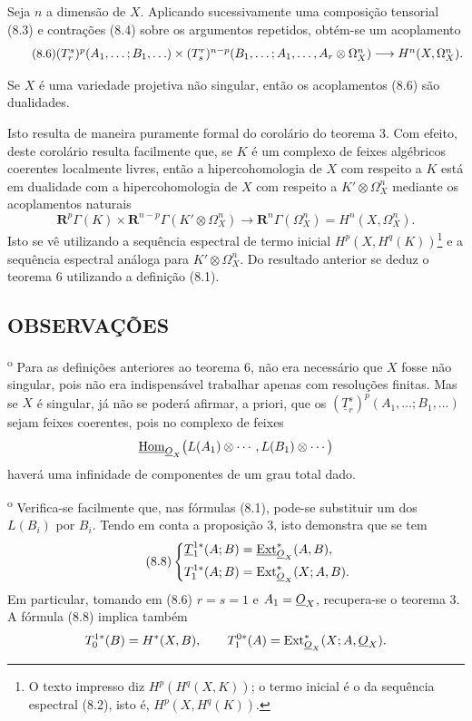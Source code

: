 Seja $n$ a dimensão de $X$. Aplicando sucessivamente uma composição
tensorial (8.3) e contrações (8.4) sobre os argumentos repetidos, obtém-se
um acoplamento
\begin{equation}\tag{8.6}
\resizebox{\textwidth}{!}{$
  (T_{r}^{s})^{p}(A_1,\ldots;B_1,\ldots)
  \times
  (T_{s}^{r})^{n-p}(B_1,\ldots;A_1,\ldots,A_r\otimes\Omega_X^{n})
  \longrightarrow H^{n}(X,\Omega_X^{n}).
$}
\end{equation}

 Se $X$ é uma variedade projetiva não singular, então
os acoplamentos (8.6) são dualidades.

Isto resulta de maneira puramente formal do corolário do teorema 3. Com efeito,
deste corolário resulta facilmente que, se $K$ é um complexo de feixes
algébricos coerentes localmente livres, então a hipercohomologia de $X$ com
respeito a $K$ está em dualidade com a hipercohomologia de $X$ com respeito a
$K'\otimes\Omega_X^{n}$ mediante os acoplamentos naturais
\begin{equation}\tag{8.7}
  \mathbf R^{p}\Gamma(K)
  \times\mathbf R^{n-p}\Gamma(K'\otimes\Omega_X^{n})
  \longrightarrow\mathbf R^{n}\Gamma(\Omega_X^{n})
  =H^{n}(X,\Omega_X^{n}).
\end{equation}
Isto se vê utilizando a sequência espectral de termo inicial
$H^{p}(X,H^{q}(K))$\footnote{O texto impresso diz
$H^{p}(H^{q}(X,K))$; o termo inicial é o da sequência espectral (8.2),
isto é, $H^{p}(X,H^{q}(K))$.} e a sequência espectral análoga para
$K'\otimes\Omega_X^{n}$. Do resultado anterior se deduz o teorema 6
utilizando a definição (8.1).

\subsection*{OBSERVAÇÕES}

\textsuperscript{o} Para as definições anteriores ao teorema 6,
não era necessário que $X$ fosse não singular, pois não era
indispensável trabalhar apenas com resoluções finitas. Mas se $X$
é singular, já não se poderá afirmar, a priori, que os
$(\underline{T}_{r}^{s})^{p}(A_1,\ldots;B_1,\ldots)$ sejam feixes
coerentes, pois no complexo de feixes
\[
  \underline{\operatorname{Hom}}_{\underline{O}_X}\bigl(L(A_1)\otimes\cdots,L(B_1)\otimes\cdots\bigr)
\]
haverá uma infinidade de componentes de um grau total dado.

\medskip
{}\textsuperscript{o} Verifica-se facilmente que, nas fórmulas
(8.1), pode-se substituir um dos $L(B_i)$ por $B_i$. Tendo em conta a
proposição 3, isto demonstra que se tem
\begin{equation}\tag{8.8}
\left\{
\begin{aligned}
  \underline{T}_{1}^{1*}(A;B)&=\underline{\operatorname{Ext}}_{\underline{O}_X}^{*}(A,B),\\
  T_{1}^{1*}(A;B)&=\operatorname{Ext}_{\underline{O}_X}^{*}(X;A,B).
\end{aligned}
\right.
\end{equation}
Em particular, tomando em (8.6) $r=s=1$ e $A_1=\underline{O}_X$, recupera-se o
teorema 3. A fórmula (8.8) implica também
\[
  T_{0}^{1*}(B)=H^{*}(X,B),
  \qquad
  T_{1}^{0*}(A)=\operatorname{Ext}_{\underline{O}_X}^{*}(X;A,\underline{O}_X).
\]

